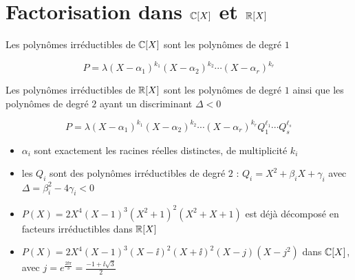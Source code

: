 \section{Factorisation dans $\mathbb{C}[X]$ et $\mathbb{R}[X]$}

\begin{frame}

\begin{theoreme}
Les polynômes irréductibles de $\mathbb{C}[X]$ sont les polynômes de degré $1$
\end{theoreme}

\pause 
$$P=\lambda (X-\alpha_1)^{k_1}(X- \alpha_2)^{k_2}\cdots(X- \alpha_r)^{k_r}$$
\end{frame}


\begin{frame}

\begin{theoreme}
Les polynômes irréductibles de $\mathbb{R}[X]$
sont les polynômes de degré $1$ ainsi que les polynômes de degré $2$ ayant
un discriminant $\Delta<0$
\end{theoreme}

\pause 

$$P=\lambda(X-\alpha_1)^{k_1}(X-\alpha_2)^{k_2}\cdots(X-\alpha_r)^{k_r}
Q_1^{\ell_1}\cdots Q_s^{\ell_s}$$

\pause

\begin{itemize}
  \item $\alpha_i$ sont exactement les racines réelles distinctes, de multiplicité $k_i$
\pause  
  \item les $Q_i$ sont des polynômes irréductibles de degré $2$ :
$Q_i=X^2+\beta_iX+\gamma_i$ avec $\Delta = \beta_i^2-4\gamma_i<0$
\end{itemize}

\bigskip
\pause

\begin{exemple}
\begin{itemize}
  \item $P(X)=2X^4(X-1)^3(X^2+1)^2(X^2+X+1)$ est déjà décomposé en facteurs irréductibles dans $\mathbb{R}[X]$
\pause
  \item $P(X)=2X^4(X-1)^3(X-\ii)^2(X+\ii)^2(X-j)(X-j^2)$ dans $\mathbb{C}[X]$, avec $j=e^{\frac{2\ii\pi}{3}}=\frac{-1+\ii\sqrt3}{2}$
\end{itemize}
\end{exemple}

\end{frame}


